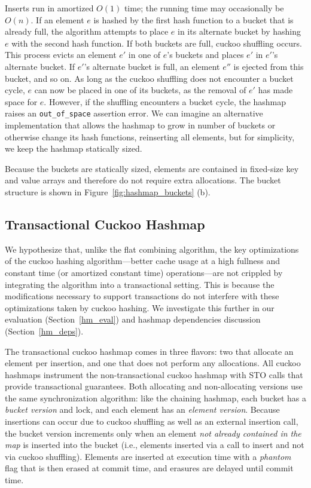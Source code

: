 Inserts run in amortized $O(1)$ time; the running time may occasionally be $O(n)$.
If an element $e$ is hashed by the first hash function to a bucket that is already full, the algorithm attempts to place $e$ in its alternate bucket by hashing $e$ with the second hash function. If both buckets are full, cuckoo shuffling occurs. This process evicts an element $e'$ in one of $e$'s buckets and places $e'$ in $e'$'s alternate bucket. If $e'$'s alternate bucket is full, an element $e''$ is ejected from this bucket, and so on. As long as the cuckoo shuffling does not encounter a bucket cycle, $e$ can now be placed in one of its buckets, as the removal of $e'$ has made space for $e$.
However, if the shuffling encounters a bucket cycle, the hashmap raises an \texttt{{out\_of\_space}} assertion error. We can imagine an alternative implementation that allows the hashmap to grow in number of buckets or otherwise change its hash functions, reinserting all elements, but for simplicity, we keep the hashmap statically sized.

Because the buckets are statically sized, elements are contained in fixed-size key and value arrays and therefore do not require extra allocations. The bucket structure is shown in Figure~\ref{fig:hashmap_buckets} (b). 

\subsection{Transactional Cuckoo Hashmap}

We hypothesize that, unlike the flat combining algorithm, the key optimizations of the cuckoo hashing algorithm---better cache usage at a high fullness and constant time (or amortized constant time) operations---are not crippled by integrating the algorithm into a transactional setting. This is because the modifications necessary to support transactions do not interfere with these optimizations taken by cuckoo hashing. We investigate this further in our evaluation (Section~\ref{hm_eval}) and hashmap dependencies discussion (Section~\ref{hm_deps}).

The transactional cuckoo hashmap comes in three flavors: two that allocate an element per insertion, and one that does not perform any allocations. All cuckoo hashmaps instrument the non-transactional cuckoo hashmap with STO calls that provide transactional guarantees.
Both allocating and non-allocating versions use the same synchronization algorithm: like the chaining hashmap, each bucket has a \emph{bucket version} and lock, and each element has an \emph{element version}. Because insertions can occur due to cuckoo shuffling as well as an external insertion call, the bucket version increments only when an element \emph{not already contained in the map} is inserted into the bucket (i.e., elements inserted via a call to insert and not via cuckoo shuffling). Elements are inserted at execution time with a \emph{phantom} flag that is then erased at commit time, and erasures are delayed until commit time.

